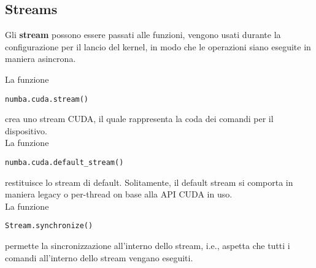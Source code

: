 \newpage

\subsection{Streams}

Gli \textbf{stream} possono essere passati alle funzioni, vengono usati durante la configurazione per il lancio del kernel, in modo che le operazioni siano eseguite in maniera asincrona.

La funzione 
\begin{verbatim}
numba.cuda.stream()
\end{verbatim}
crea uno stream CUDA, il quale rappresenta la coda dei comandi per il dispositivo.\\

La funzione
\begin{verbatim}
numba.cuda.default_stream()
\end{verbatim}
restituisce lo stream di default. Solitamente, il default stream si comporta in maniera legacy o per-thread on base alla API CUDA in uso.\\

La funzione
\begin{verbatim}
Stream.synchronize()
\end{verbatim}
permette la sincronizzazione all'interno dello stream, i.e., aspetta che tutti i comandi all'interno dello stream vengano eseguiti.\\



